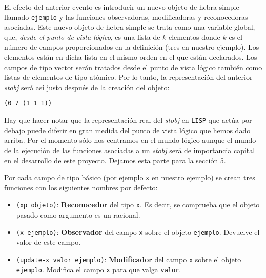 \documentclass[a4paper,10pt]{article}
\begin{document}
\par \vspace{10pt}

El efecto del anterior evento es introducir un nuevo objeto de hebra simple llamado \texttt{ejemplo} y las funciones observadoras, modificadoras y reconocedoras asociadas. Este nuevo objeto de hebra simple se trata como una variable global, que, \emph{desde el punto de vista lógico}, es una lista de $k$ elementos donde $k$ es el número de campos proporcionados en la definición (tres en nuestro ejemplo). Los elementos están en dicha lista en el mismo orden en el que están declarados. Los campos de tipo vector serán tratados desde el punto de vista lógico también como listas de elementos de tipo atómico. Por lo tanto, la representación del anterior \emph{stobj} será así justo después de la creación del objeto:

\par \vspace{10pt}

\begin{lstlisting}[language=clips]
(0 7 (1 1 1))
\end{lstlisting}

\par \vspace{10pt}

Hay que hacer notar que la representación real del \emph{stobj} en \texttt{LISP} que actúa por debajo puede diferir en gran medida del punto de vista lógico que hemos dado arriba. Por el momento sólo nos centramos en el mundo lógico aunque el mundo de la ejecución de las funciones asociadas a un \emph{stobj} será de importancia capital en el desarrollo de este proyecto. Dejamos esta parte para la sección 5.

\par \vspace{10pt}

Por cada campo de tipo básico (por ejemplo \texttt{x} en nuestro ejemplo) se crean tres funciones con los siguientes nombres por defecto: 

\par \vspace{10pt}

\begin{itemize}
	\item \texttt{(xp objeto)}: \textbf{Reconocedor} del tipo \texttt{x}. Es decir, se comprueba que el objeto pasado como argumento es un racional.
	\item \texttt{(x ejemplo)}: \textbf{Observador} del campo \texttt{x} sobre el objeto \texttt{ejemplo}. Devuelve el valor de este campo.
	\item \texttt{(update-x valor ejemplo)}: \textbf{Modificador} del campo \texttt{x} sobre el objeto \texttt{ejemplo}. Modifica el campo \texttt{x} para que valga \texttt{valor}.
\end{itemize}
\end{document}
